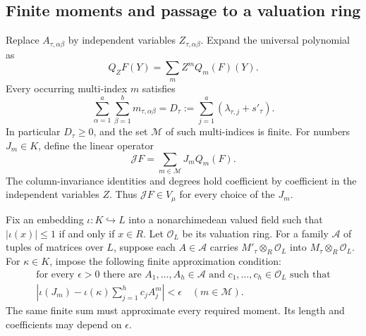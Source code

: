 \subsection{Finite moments and passage to a valuation ring}

Replace $A_{\tau,\alpha\beta}$ by independent variables
$Z_{\tau,\alpha\beta}$.  Expand the universal polynomial as
\begin{equation}\label{cv-universal-expansion}
                Q_ZF(Y)=\sum_m Z^m Q_m(F)(Y).
\end{equation}
Every occurring multi-index $m$ satisfies
\begin{equation}\label{cv-finite-degrees}
 \sum_{\alpha=1}^{a}\sum_{\beta=1}^{b}m_{\tau,\alpha\beta}
      =D_\tau:=\sum_{j=1}^{a}(\lambda_{\tau,j}+s'_\tau).
\end{equation}
In particular $D_\tau\ge0$, and the set $\mathcal M$ of such
multi-indices is finite.  For numbers $J_m\in K$, define the linear
operator
\[
                     \mathcal JF=\sum_{m\in\mathcal M}J_mQ_m(F).
 \tag{CV2}
\]
The column-invariance identities and degrees hold coefficient by
coefficient in the independent variables $Z$.  Thus
$\mathcal JF\in V_\mu$ for every choice of the $J_m$.

Fix an embedding $\iota:K\hookrightarrow L$ into a nonarchimedean
valued field such that $|\iota(x)|\le1$ if and only if $x\in R$.
Let $\mathcal O_L$ be its valuation ring.  For a family $\mathscr A$
of tuples of matrices over $L$, suppose each $A\in\mathscr A$
carries $M'_\tau\otimes_R\mathcal O_L$ into
$M_\tau\otimes_R\mathcal O_L$.  For $\kappa\in K$, impose the
following finite approximation condition:
\begin{equation}\label{cv-moment-approximation}
 \begin{gathered}
 \text{for every }\epsilon>0\text{ there are }A_1,\ldots,A_h\in
 \mathscr A\text{ and }c_1,\ldots,c_h\in\mathcal O_L\text{ such that}\\
 \left|\iota(J_m)-\iota(\kappa)\sum_{j=1}^h c_j A_j^m\right|
                  <\epsilon\quad(m\in\mathcal M).
 \end{gathered}
\end{equation}
The same finite sum must approximate every required moment.  Its
length and coefficients may depend on $\epsilon$.

